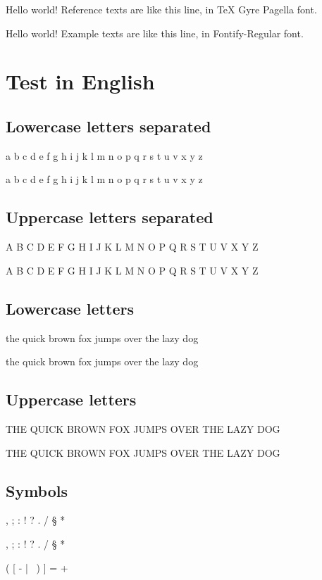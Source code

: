 \documentclass[a4paper,10pt]{article}
\begin{document}
{\Reference Hello world! Reference texts are like this line, in TeX Gyre Pagella font.}

{\Fontify Hello world! Example texts are like this line, in Fontify-Regular font.}


\section{Test in English}
\subsection{Lowercase letters separated}

{\Reference a b c d e f g h i j k l m n o p q r s t u v x y z}

{\Fontify a b c d e f g h i j k l m n o p q r s t u v x y z}


\subsection{Uppercase letters separated}

{\Reference A B C D E F G H I J K L M N O P Q R S T U V X Y Z}

{\Fontify A B C D E F G H I J K L M N O P Q R S T U V X Y Z}


\subsection{Lowercase letters}

{\Reference the quick brown fox jumps over the lazy dog}

{\Fontify the quick brown fox jumps over the lazy dog}


\subsection{Uppercase letters}

{\Reference THE QUICK BROWN FOX JUMPS OVER THE LAZY DOG}

{\Fontify THE QUICK BROWN FOX JUMPS OVER THE LAZY DOG}


\subsection{Symbols}

{\Reference , ; : ! ? . / § *}

{\Fontify , ; : ! ? . / § *}


{\Reference ( [ - | \ ) ] = +}
\end{document}
